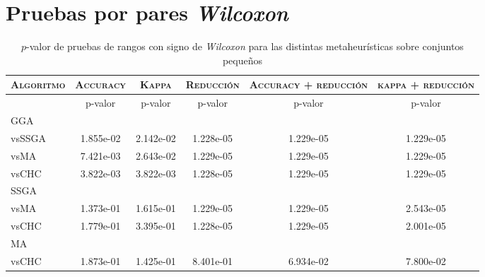 \chapter{Pruebas por pares \emph{Wilcoxon}}
\label{Apéndices}

\begin{table}[h!]
\centering
\begin{adjustbox}{max width =\textwidth}
\begin{tabular}{l c c c c c}
\hline
	\textsc{Algoritmo}
	& \multicolumn{1}{c}{\textsc{Accuracy}}
	& \multicolumn{1}{c}{\textsc{Kappa}}
	& \multicolumn{1}{c}{\textsc{Reducción}} 
	& \multicolumn{1}{c}{\textsc{Accuracy + reducción}} 
	& \multicolumn{1}{c}{\textsc{kappa + reducción}} \\
\hline
\hline

 & p-valor & p-valor & p-valor & p-valor & p-valor \\

GGA \\
vsSSGA & 1.855e-02 & 2.142e-02 & 1.228e-05 & 1.229e-05 & 1.229e-05 \\
vsMA & 7.421e-03 & 2.643e-02 & 1.229e-05 & 1.229e-05 & 1.229e-05 \\
vsCHC & 3.822e-03 & 3.822e-03 & 1.228e-05 & 1.229e-05 & 1.229e-05 \\

\hline

SSGA \\
vsMA & 1.373e-01 & 1.615e-01 & 1.229e-05 & 1.229e-05 & 2.543e-05 \\
vsCHC & 1.779e-01 & 3.395e-01 & 1.228e-05 & 1.229e-05 & 2.001e-05 \\

\hline

MA \\
vsCHC & 1.873e-01 & 1.425e-01 & 8.401e-01 & 6.934e-02 & 7.800e-02 \\ 

\hline

\end{tabular}
\end{adjustbox}
\caption[Pruebas de \emph{Wilcoxon} entre las metaheurísticas para conjuntos pequeños]{$p$-valor de pruebas de rangos con signo de \emph{Wilcoxon} para las distintas metaheurísticas sobre conjuntos pequeños}
\label{wilcox-meta-peq}
\end{table}

